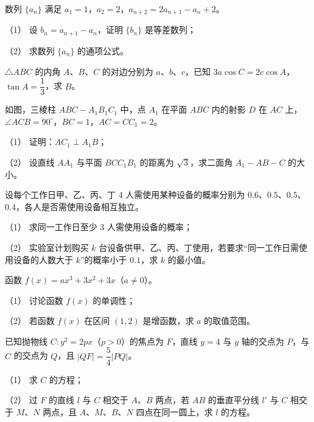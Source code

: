 \begin{question}
数列 $\{a_n\}$ 满足 $a_1=1$，$a_2=2$，$a_{n+2}=2a_{n+1}-a_n+2$。

（1） 设 $b_n=a_{n+1}-a_n$，证明 $\{b_n\}$ 是等差数列；

（2） 求数列 $\{a_n\}$ 的通项公式。

\end{question}
\begin{question}
$\triangle ABC$ 的内角 $A$、$B$、$C$ 的对边分别为 $a$、$b$、$c$，已知 $3a\cos C=2c\cos A$，$\tan A=\dfrac13$，求 $B$。

\Needspace{0.4\textheight}
\end{question}
\begin{question}
如图，三棱柱 $ABC-A_1B_1C_1$ 中，点 $A_1$ 在平面 $ABC$ 内的射影 $D$ 在 $AC$ 上，$\angle ACB=90^\circ$，$BC=1$，$AC=CC_1=2$。
\nopagebreak[4]
\begin{center}\end{center}
\nopagebreak[4]
（1） 证明：$AC_1\perp A_1B$；

（2） 设直线 $AA_1$ 与平面 $BCC_1B_1$ 的距离为 $\sqrt3$，求二面角 $A_1-AB-C$ 的大小。

\end{question}
\begin{question}
设每个工作日甲、乙、丙、丁 4 人需使用某种设备的概率分别为 $0.6$、$0.5$、$0.5$、$0.4$，各人是否需使用设备相互独立。

（1） 求同一工作日至少 3 人需使用设备的概率；

（2） 实验室计划购买 $k$ 台设备供甲、乙、丙、丁使用，若要求“同一工作日需使用设备的人数大于 $k$”的概率小于 $0.1$，求 $k$ 的最小值。

\end{question}
\begin{question}
函数 $f(x)=ax^3+3x^2+3x$（$a\neq0$）。

（1） 讨论函数 $f(x)$ 的单调性；

（2） 若函数 $f(x)$ 在区间 $(1,2)$ 是增函数，求 $a$ 的取值范围。

\end{question}
\begin{question}
已知抛物线 $C:y^2=2px$（$p>0$）的焦点为 $F$，直线 $y=4$ 与 $y$ 轴的交点为 $P$，与 $C$ 的交点为 $Q$，且 $|QF|=\dfrac54|PQ|$。

（1） 求 $C$ 的方程；

（2） 过 $F$ 的直线 $l$ 与 $C$ 相交于 $A$、$B$ 两点，若 $AB$ 的垂直平分线 $l'$ 与 $C$ 相交于 $M$、$N$ 两点，且 $A$、$M$、$B$、$N$ 四点在同一圆上，求 $l$ 的方程。

\end{question}